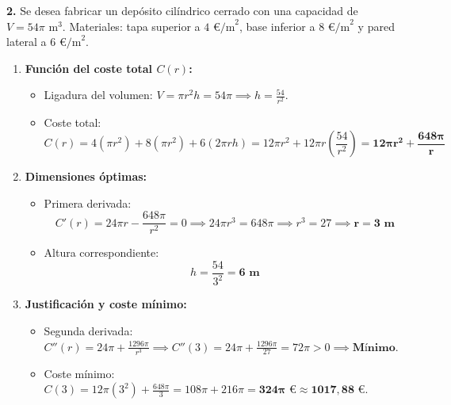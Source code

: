 \documentclass[11pt,a4paper]{article}
\begin{document}
\noindent\textbf{2.} Se desea fabricar un depósito cilíndrico cerrado con una capacidad de $V = 54\pi\text{ m}^3$. Materiales: tapa superior a $4\text{ €/m}^2$, base inferior a $8\text{ €/m}^2$ y pared lateral a $6\text{ €/m}^2$.
\begin{enumerate}[label=\textbf{\alph*)}, leftmargin=2em, itemsep=6pt]
    \item \textbf{Función del coste total $C(r)$:}
    \begin{itemize}[leftmargin=1.5em, itemsep=2pt]
        \item Ligadura del volumen: $V = \pi r^2 h = 54\pi \implies h = \frac{54}{r^2}$.
        \item Coste total:
        \[
        C(r) = 4(\pi r^2) + 8(\pi r^2) + 6(2\pi r h) = 12\pi r^2 + 12\pi r \left(\frac{54}{r^2}\right) = \mathbf{12\pi r^2 + \frac{648\pi}{r}}
        \]
    \end{itemize}

    \item \textbf{Dimensiones óptimas:}
    \begin{itemize}[leftmargin=1.5em, itemsep=2pt]
        \item Primera derivada:
        \[
        C'(r) = 24\pi r - \frac{648\pi}{r^2} = 0 \implies 24\pi r^3 = 648\pi \implies r^3 = 27 \implies \mathbf{r = 3\text{ m}}
        \]
        \item Altura correspondiente:
        \[
        h = \frac{54}{3^2} = \mathbf{6\text{ m}}
        \]
    \end{itemize}

    \item \textbf{Justificación y coste mínimo:}
    \begin{itemize}[leftmargin=1.5em, itemsep=2pt]
        \item Segunda derivada: $C''(r) = 24\pi + \frac{1296\pi}{r^3} \implies C''(3) = 24\pi + \frac{1296\pi}{27} = 72\pi > 0 \implies \textbf{Mínimo}$.
        \item Coste mínimo: $C(3) = 12\pi(3^2) + \frac{648\pi}{3} = 108\pi + 216\pi = \mathbf{324\pi\text{ €} \approx 1017{,}88\text{ €}}$.
    \end{itemize}
\end{enumerate}
\end{document}
